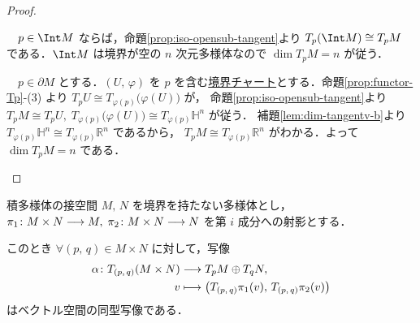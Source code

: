 \documentclass[geometry_main]{subfiles}
\begin{document}
\begin{proof}
\begin{description}
		　$p \in \Int M$ ならば，命題\ref{prop:iso-opensub-tangent}より $T_p (\Int M) \cong T_p M$ である．$\Int M$ は境界が空の $n$ 次元\cinfty 多様体なので $\dim T_p M = n$ が従う．
		
		　$p \in \partial M$ とする．$(U,\, \varphi)$ を $p$ を含む\hyperref[def:int-manifold-with-boundary]{境界チャート}とする．命題\ref{prop:functor-Tp}-(3) より $T_p U \cong T_{\varphi(p)}\bigl( \varphi(U) \bigr) $ が，
		命題\ref{prop:iso-opensub-tangent}より $T_p M \cong T_p U,\; T_{\varphi(p)} \bigl( \varphi(U) \bigr) \cong T_{\varphi (p)} \mathbb{H}^n$ が従う．
		補題\ref{lem:dim-tangentv-b}より $T_{\varphi(p)} \mathbb{H}^n \cong T_{\varphi(p)}\mathbb{R}^n$ であるから，
		$T_p M \cong T_{\varphi(p)} \mathbb{R}^n$ がわかる．よって $\dim T_p M = n$ である．
	\end{description}
	
\end{proof}

\begin{myprop}[label=prop:product-tangentv]{積多様体の接空間}
	$M,\, N$ を境界を持たない\cinfty 多様体とし，$\pi_1 \colon M \times N \longrightarrow M,\; \pi_2 \colon M \times N \longrightarrow N$ を第 $i$ 成分への射影とする．
	
	このとき $\forall (p,\, q) \in M \times N$ に対して，写像
	\begin{align}
		\alpha \colon T_{(p,\, q)} (M \times N) &\longrightarrow T_p M \oplus T_q N, \\
		v &\longmapsto \bigl( T_{(p,\, q)} \pi_1 (v),\, T_{(p,\, q)} \pi_2 (v)  \bigr) 
	\end{align}
	はベクトル空間の同型写像である．
\end{myprop}
\end{document}
